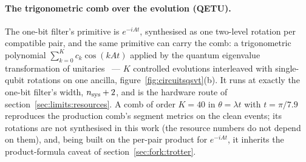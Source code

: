 \documentclass[11pt,a4paper]{article}
\begin{document}
\paragraph{The trigonometric comb over the evolution (QETU).} The one-bit
filter's primitive is $e^{-iAt}$, synthesised as one two-level rotation per
compatible pair, and the same primitive can carry the comb: a
trigonometric polynomial $\sum_{k=0}^{K}c_k\cos(kAt)$ applied by the
quantum eigenvalue transformation of unitaries~\cite{dong2022} --- $K$
controlled evolutions interleaved with single-qubit rotations on one
ancilla, figure~\ref{fig:circuitsqsvt}(b). It runs at exactly the one-bit
filter's width, $n_{\rm sys}+2$, and is the hardware route of
section~\ref{sec:limits:resources}. A comb of order $K=40$ in
$\theta=\lambda t$ with $t=\pi/7.9$ reproduces the production comb's
segment metrics on the clean events; its rotations are not synthesised in
this work (the resource numbers do not depend on them), and, being built on
the per-pair product for $e^{-iAt}$, it inherits the product-formula
caveat of section~\ref{sec:fork:trotter}.

\begin{table}[H]
\centering
\footnotesize
\setlength{\tabcolsep}{4pt}
\caption{The three realisations of the degree-40 comb, with HHL and the
one-bit filter for reference. Ancillas are beyond the system register
$n_{\rm sys}=\lceil\log_2 4T^{2}\rceil$; ``calls'' counts uses of the
primitive per shot before amplification; ``exact'' says whether the circuit
applies the intended response exactly or through an approximation (the
finite clock for HHL, the per-pair product for $e^{-iAt}$). The block
encoding's own price is a separate axis, section~\ref{sec:qsvt:resources}.}
\label{tab:realisations}
\end{table}
\end{document}

